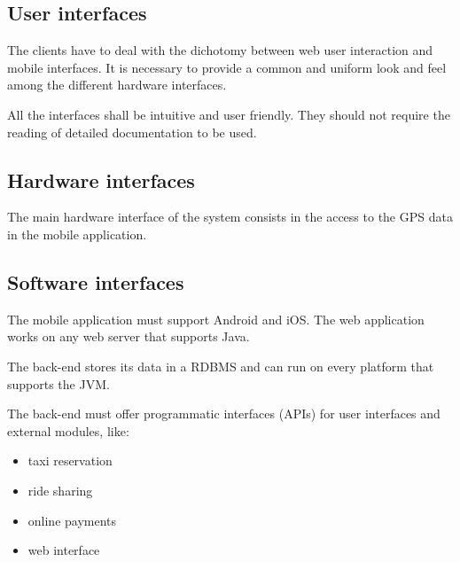
\subsection{User interfaces}
The clients have to deal with the dichotomy between web user interaction and mobile interfaces.
It is necessary to provide a common and uniform look and feel among the different hardware interfaces.

All the interfaces shall be intuitive and user friendly. They should not require the reading of detailed documentation to be used.

\subsection{Hardware interfaces}

The main hardware interface of the system consists in the access to the GPS data in the mobile application.

\subsection{Software interfaces}
The mobile application must support Android and iOS.
The web application works on any web server that supports Java.

The back-end stores its data in a RDBMS and  can run on every platform that supports the JVM.

The back-end must offer programmatic interfaces (APIs) for user interfaces and external modules, like:
\begin{itemize}
\item taxi reservation
\item ride sharing
\item online payments
\item web interface
\end{itemize}
